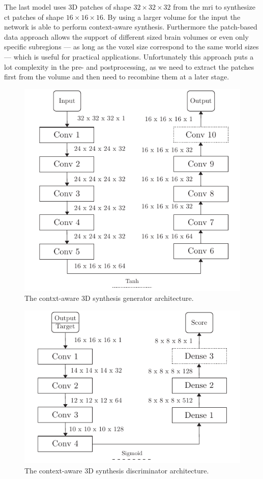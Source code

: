 The last model uses 3D patches of shape $32\times32\times32$ from the
\gls{mri} to synthesize \gls{ct} patches of shape $16\times16\times16$. By
using a larger volume for the input the network is able to perform
context-aware synthesis. Furthermore the patch-based data approach allows the
support of different sized brain volumes or even only specific subregions ---
as long as the voxel size correspond to the same world sizes --- which is
useful for practical applications. Unfortunately this approach puts a lot
complexity in the pre- and postprocessing, as we need to extract the patches
first from the volume and then need to recombine them at a later stage.
\begin{figure}[h]
  \centering
  \includegraphics[width=\linewidth]{figure/synthesis-gen.pdf}
  \caption{The contxt-aware 3D synthesis generator architecture.
  }\label{fig:synthesis:gen}
\end{figure}
\begin{figure}[h]
  \centering
  \includegraphics[width=\linewidth]{figure/synthesis-disc.pdf}
  \caption{The context-aware 3D synthesis discriminator architecture.
	}\label{fig:synthesis:disc}
\end{figure}

